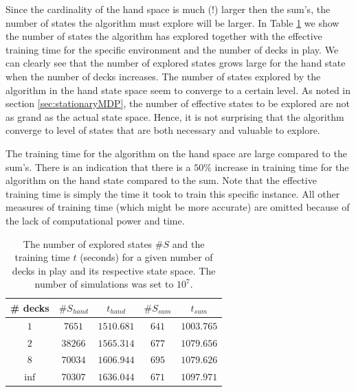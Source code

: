 Since the cardinality of the hand space is much (!) larger then the sum's, the number of states the algorithm must explore will be larger. In Table \ref{tab:state_visited} we show the number of states the algorithm has explored together with the effective training time for the specific environment and the number of decks in play. We can clearly see that the number of explored states grows large for the hand state when the number of decks increases. The number of states explored by the algorithm in the hand state space seem to converge to a certain level. As noted in section \ref{sec:stationaryMDP}, the number of effective states to be explored are not as grand as the actual state space. Hence, it is not surprising that the algorithm converge to level of states that are both necessary and valuable to explore. 

The training time for the algorithm on the hand space are large compared to the sum's. There is an indication that there is a $50\%$ increase in training time for the algorithm on the hand state compared to the sum. Note that the effective training time is simply the time it took to train this specific instance. All other measures of training time (which might be more accurate) are omitted because of the lack of computational power and time.
\begin{table}[h!]
\centering
 \begin{tabular}{c|cc|cc}
  \# decks & $\#S_{hand}$ & $t_{hand}$ & $\#S_{sum}$ &  $t_{sum}$  \\
  \hline 
  $1$ & $7651$ & $1510.681$ & $641$ & $1003.765$ \\
  $2$ & $38266$ & $1565.314$ & $677$ & $1079.656$ \\
  $8$ & $70034$ & $1606.944$ & $695$ & $1079.626$ \\
  $\inf$ & $70307$ & $1636.044$ & $671$ & $1097.971$ 
 \end{tabular} 
 \caption{The number of explored states $\#S$ and the training time $t$ (seconds) for a given number of decks in play and its respective state space. The number of simulations was set to $10^7$.\label{tab:state_visited}}
\end{table}


